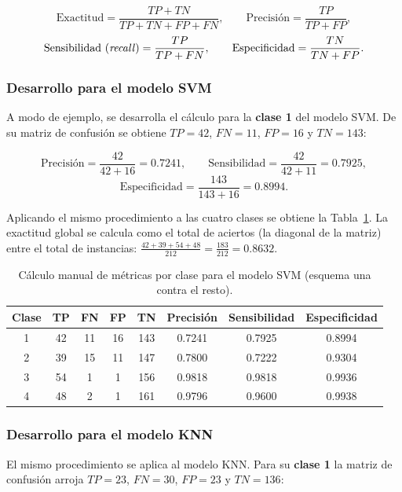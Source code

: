 \documentclass[11pt,letterpaper,twoside]{article}
\begin{document}
\begin{equation}
\text{Exactitud} = \frac{TP+TN}{TP+TN+FP+FN}, \qquad
\text{Precisión} = \frac{TP}{TP+FP},
\label{eq:acc_prec}
\end{equation}
\begin{equation}
\text{Sensibilidad (\textit{recall})} = \frac{TP}{TP+FN}, \qquad
\text{Especificidad} = \frac{TN}{TN+FP}.
\label{eq:rec_spec}
\end{equation}

\subsubsection{Desarrollo para el modelo SVM}
A modo de ejemplo, se desarrolla el cálculo para la \textbf{clase 1} del modelo SVM. De su matriz de confusión se obtiene $TP=42$, $FN=11$, $FP=16$ y $TN=143$:

\begin{resultado}
\[
\text{Precisión} = \frac{42}{42+16} = 0.7241, \qquad
\text{Sensibilidad} = \frac{42}{42+11} = 0.7925,
\]
\[
\text{Especificidad} = \frac{143}{143+16} = 0.8994.
\]
\end{resultado}

Aplicando el mismo procedimiento a las cuatro clases se obtiene la Tabla~\ref{tab:manualsvm}. La exactitud global se calcula como el total de aciertos (la diagonal de la matriz) entre el total de instancias: $\tfrac{42+39+54+48}{212}=\tfrac{183}{212}=0.8632$.

\begin{table}[H]
\centering
\caption{Cálculo manual de métricas por clase para el modelo SVM (esquema una contra el resto).}
\label{tab:manualsvm}
\begin{tabular}{cccccccc}
\toprule
\textbf{Clase} & \textbf{TP} & \textbf{FN} & \textbf{FP} & \textbf{TN} & \textbf{Precisión} & \textbf{Sensibilidad} & \textbf{Especificidad} \\
\midrule
1 & 42 & 11 & 16 & 143 & 0.7241 & 0.7925 & 0.8994 \\
2 & 39 & 15 & 11 & 147 & 0.7800 & 0.7222 & 0.9304 \\
3 & 54 &  1 &  1 & 156 & 0.9818 & 0.9818 & 0.9936 \\
4 & 48 &  2 &  1 & 161 & 0.9796 & 0.9600 & 0.9938 \\
\bottomrule
\end{tabular}
\end{table}

\subsubsection{Desarrollo para el modelo KNN}
El mismo procedimiento se aplica al modelo KNN. Para su \textbf{clase 1} la matriz de confusión arroja $TP=23$, $FN=30$, $FP=23$ y $TN=136$:
\end{document}
